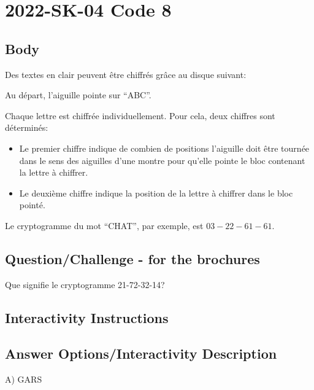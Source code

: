 \documentclass[a4paper,11pt]{report}
\newcommand{\taskGraphicsFolder}{..}
\begin{document}
\section*{\centering{} 2022-SK-04 Code 8}


\subsection*{Body}

Des textes en clair peuvent être chiffrés grâce au disque suivant:

{\centering%
\par}

Au départ, l’aiguille pointe sur “ABC”.

Chaque lettre est chiffrée individuellement. Pour cela, deux chiffres sont déterminés:

\begin{itemize}
  \item Le premier chiffre indique de combien de positions l’aiguille doit être tournée dans le sens des aiguilles d’une montre pour qu’elle pointe le bloc contenant la lettre à chiffrer.
  \item Le deuxième chiffre indique la position de la lettre à chiffrer dans le bloc pointé.
\end{itemize}

Le cryptogramme du mot “CHAT”, par exemple, est ${03-22-61-61}$.

{\em


\subsection*{Question/Challenge - for the brochures}

Que signifie le cryptogramme 21-72-32-14?

}


\subsection*{Interactivity Instructions}



\begingroup
\renewcommand{\arraystretch}{1.5}
\subsection*{Answer Options/Interactivity Description}

A) GARS
\end{document}
